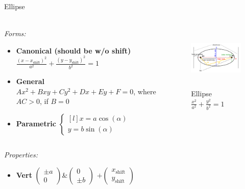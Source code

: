 \documentclass[aspectratio=169]{beamer}
\newcommand{\shf}{\text{shift}}
\begin{document}
\begin{frame}[t]{Ellipse}
    \framesubtitle{}
        \scriptsize
        \vspace{-0.4cm}
    \begin{columns}[T,onlytextwidth]
        \begin{column}{0.59\textwidth}
            \textit{Forms:} \\
            \begin{itemize}
                \item \textbf{Canonical (should be w/o shift)} $\frac{(x-x_{\shf})^2}{a^2}+\frac{(y-y_{\shf})^2}{b^2}=1$
                \item \textbf{General} $Ax^2+Bxy+Cy^2+Dx+Ey+F=0$, where $AC > 0$, if $B=0$
                \item \textbf{Parametric} $\left\{\begin{matrix*}[l] x = a\cos(\alpha)\\ y = b\sin(\alpha) \end{matrix*}\right.$
            \end{itemize}
        \end{column}
        \begin{column}{0.39\textwidth}
            \vspace{-0.5cm}
            \begin{figure}[H]
                \centering\includegraphics[height=3cm,width=1\textwidth,keepaspectratio]{Ellipse.png}
                \vspace{-0.5cm}
                \caption*{\scriptsize Ellipse $\frac{x^2}{a^2}+\frac{y^2}{b^2}=1$}
                \label{fig:Ellipse.png}
            \end{figure}
        \end{column}
    \end{columns}
    \vspace{-0.5cm}
    \textit{Properties:}
    \vspace{-0.2cm}
    \begin{multicols}{3}
        \begin{itemize}
            \item \textbf{Vert} $\begin{pmatrix} \pm a\\0 \end{pmatrix}$\&$\begin{pmatrix} 0\\\pm b \end{pmatrix}$ $ + \begin{pmatrix} x_{\shf}\\y_{\shf} \end{pmatrix}$

\end{itemize}
\end{multicols}
\end{frame}
\end{document}
